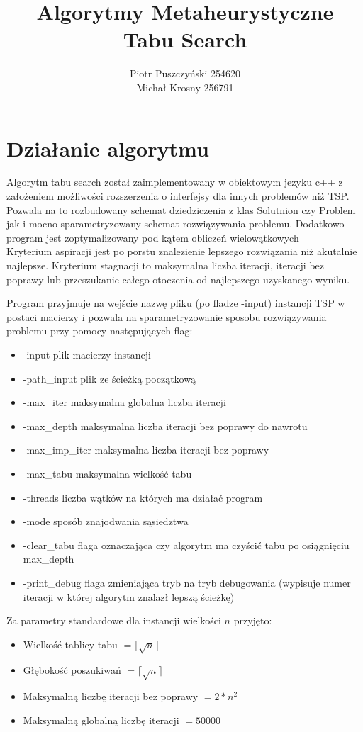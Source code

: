 \documentclass{article}
\title{Algorytmy Metaheurystyczne\\Tabu Search}
\author{Piotr Puszczyński 254620\\Michał Krosny 256791}
\begin{document}
\maketitle
\newpage

\section{Działanie algorytmu}

Algorytm tabu search został zaimplementowany w obiektowym jezyku c++ z
założeniem możliwości rozszerzenia o interfejsy dla innych problemów niż
TSP. Pozwala na to rozbudowany schemat dziedziczenia z klas Solutnion czy Problem
jak i mocno sparametryzowany schemat rozwiązywania problemu. Dodatkowo program jest
zoptymalizowany pod kątem obliczeń wielowątkowych\\
Kryterium aspiracji jest po porstu znalezienie lepszego rozwiązania niż akutalnie najlepsze.
Kryterium stagnacji to maksymalna liczba iteracji, iteracji bez poprawy lub przeszukanie
całego otoczenia od najlepszego uzyskanego wyniku.

Program przyjmuje na wejście nazwę pliku (po fladze -input) instancji TSP w postaci macierzy i pozwala
na sparametryzowanie sposobu rozwiązywania problemu przy pomocy następujących flag:\\
\begin{itemize}
    \item -input plik macierzy instancji
    \item -path\_input plik ze ścieżką początkową
    \item -max\_iter maksymalna globalna liczba iteracji
    \item -max\_depth maksymalna liczba iteracji bez poprawy do nawrotu
    \item -max\_imp\_iter maksymalna liczba iteracji bez poprawy
    \item -max\_tabu maksymalna wielkość tabu
    \item -threads liczba wątków na których ma działać program
    \item -mode sposób znajodwania sąsiedztwa
    \item -clear\_tabu flaga oznaczająca czy algorytm ma czyścić tabu po osiągnięciu max\_depth
    \item -print\_debug flaga zmieniająca tryb na tryb debugowania (wypisuje numer iteracji w której algorytm znalazł lepszą ścieżkę)
\end{itemize}

\noindent Za parametry standardowe dla instancji wielkości $n$ przyjęto:\\
\begin{itemize}
  \item Wielkość tablicy tabu $= \lceil \sqrt{n} \rceil $
  \item Głębokość poszukiwań $= \lceil \sqrt{n} \rceil $
  \item Maksymalną liczbę iteracji bez poprawy $= 2 * n^2 $
  \item Maksymalną globalną liczbę iteracji $= 50000$
\end{itemize}
\end{document}
